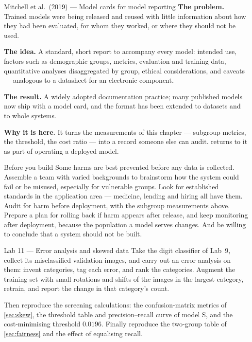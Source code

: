 \begin{researchspotlight}{Mitchell et al.\ (2019) --- Model cards for model reporting}
\textbf{The problem.} Trained models were being released and reused with little
information about how they had been evaluated, for whom they worked, or where
they should not be used.

\textbf{The idea.} A standard, short report to accompany every model: intended
use, factors such as demographic groups, metrics, evaluation and training data,
quantitative analyses disaggregated by group, ethical considerations, and
caveats --- analogous to a datasheet for an electronic component.

\textbf{The result.} A widely adopted documentation practice; many published
models now ship with a model card, and the format has been extended to datasets
and to whole systems.

\textbf{Why it is here.} It turns the measurements of this chapter --- subgroup
metrics, the threshold, the cost ratio --- into a record someone else can audit.
 returns to it as part of operating a deployed model.
\parencite{mitchellm2019}
\end{researchspotlight}

\begin{ethicsnote}{Before you build}
Some harms are best prevented before any data is collected. Assemble a team
with varied backgrounds to brainstorm how the system could fail or be misused,
especially for vulnerable groups. Look for established standards in the
application area --- medicine, lending and hiring all have them. Audit for harm
before deployment, with the subgroup measurements above. Prepare a plan for
rolling back if harm appears after release, and keep monitoring after
deployment, because the population a model serves changes. And be willing to
conclude that a system should not be built.
\end{ethicsnote}

\begin{labbox}{Lab 11 --- Error analysis and skewed data}
Take the digit classifier of Lab~9, collect its misclassified validation images,
and carry out an error analysis on them: invent categories, tag each error, and
rank the categories. Augment the training set with small rotations and shifts
of the images in the largest category, retrain, and report the change in that
category's count.

Then reproduce the screening calculations: the confusion-matrix metrics of
\cref{sec:skew}, the threshold table and precision--recall curve of model S, and
the cost-minimising threshold $0.0196$. Finally reproduce the two-group table of
\cref{sec:fairness} and the effect of equalising recall.
\end{labbox}

